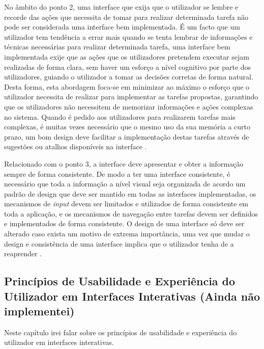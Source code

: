 No âmbito do ponto 2, uma interface que exija que o utilizador se lembre e recorde das ações que necessita de tomar para realizar determinada tarefa não pode ser considerada uma interface bem implementada. É um facto que um utilizador tem tendência a errar mais quando se tenta lembrar de informações e técnicas necessárias para realizar determinada tarefa, uma interface bem implementada exije que as ações que os utilizadores pretendem executar sejam realizadas de forma clara, sem haver um esforço a nível cognitivo por parte dos utilizadores, guiando o utilizador a tomar as decisões corretas de forma natural. Desta forma, esta abordagem foca-se em minimizar ao máximo o esforço que o utilizador necessita de realizar para implementar as tarefas propostas, garantindo que os utilizadores não necessitem de memorizar informações e ações complexas no sistema. Quando é pedido aos utilizadores para realizarem tarefas mais complexas, é muitas vezes necessário que o mesmo uso da sua memória a curto prazo, um bom design deve facilitar a implementação destas tarefas através de sugestões ou atalhos disponíveis na interface \cite{sridevi2014user}.

Relacionado com o ponto 3, a interface deve apresentar e obter a informação sempre de forma consistente. De modo a ter uma interface consistente, é necessário que toda a informação a nível visual seja organizada de acordo um padrão de design que deve ser mantido em todas as interfaces implementadas, os mecanismos de \textit{input} devem ser limitados e utilizados de forma consistente em toda a aplicação, e os mecanismos de navegação entre tarefas devem ser definidos e implementados de forma consistente. O design de uma interface só deve ser alterado caso exista um motivo de extrema importância, uma vez que mudar o design e consistência de uma interface implica que o utilizador tenha de a reaprender \cite{sridevi2014user}.

\subsection{Princípios de Usabilidade e Experiência do Utilizador em Interfaces Interativas (Ainda não implementei)} %
\label{sub:principios_usabilidade}

Neste capítulo irei falar sobre os princípios de usabilidade e experiência do utilizador em interfaces interativas.


